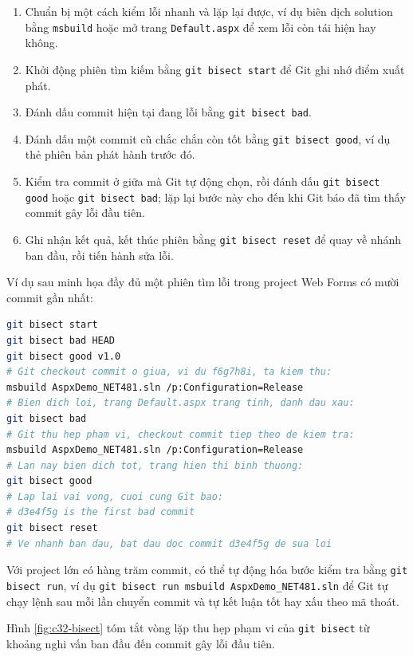 \begin{enumerate}
\item Chuẩn bị một cách kiểm lỗi nhanh và lặp lại được, ví dụ biên dịch solution bằng \verb|msbuild| hoặc mở trang \verb|Default.aspx| để xem lỗi còn tái hiện hay không.
\item Khởi động phiên tìm kiếm bằng \verb|git bisect start| để Git ghi nhớ điểm xuất phát.
\item Đánh dấu commit hiện tại đang lỗi bằng \verb|git bisect bad|.
\item Đánh dấu một commit cũ chắc chắn còn tốt bằng \verb|git bisect good|, ví dụ thẻ phiên bản phát hành trước đó.
\item Kiểm tra commit ở giữa mà Git tự động chọn, rồi đánh dấu \verb|git bisect good| hoặc \verb|git bisect bad|; lặp lại bước này cho đến khi Git báo đã tìm thấy commit gây lỗi đầu tiên.
\item Ghi nhận kết quả, kết thúc phiên bằng \verb|git bisect reset| để quay về nhánh ban đầu, rồi tiến hành sửa lỗi.
\end{enumerate}

Ví dụ sau minh họa đầy đủ một phiên tìm lỗi trong project Web Forms có mười commit gần nhất:

\begin{lstlisting}[language=bash, caption={Quy trinh git bisect tim commit gay loi dau tien}, label={lst:c32-bisect}]
git bisect start
git bisect bad HEAD
git bisect good v1.0
# Git checkout commit o giua, vi du f6g7h8i, ta kiem thu:
msbuild AspxDemo_NET481.sln /p:Configuration=Release
# Bien dich loi, trang Default.aspx trang tinh, danh dau xau:
git bisect bad
# Git thu hep pham vi, checkout commit tiep theo de kiem tra:
msbuild AspxDemo_NET481.sln /p:Configuration=Release
# Lan nay bien dich tot, trang hien thi binh thuong:
git bisect good
# Lap lai vai vong, cuoi cung Git bao:
# d3e4f5g is the first bad commit
git bisect reset
# Ve nhanh ban dau, bat dau doc commit d3e4f5g de sua loi
\end{lstlisting}

Với project lớn có hàng trăm commit, có thể tự động hóa bước kiểm tra bằng \verb|git bisect run|, ví dụ \verb|git bisect run msbuild AspxDemo_NET481.sln| để Git tự chạy lệnh sau mỗi lần chuyển commit và tự kết luận tốt hay xấu theo mã thoát.

Hình \ref{fig:c32-bisect} tóm tắt vòng lặp thu hẹp phạm vi của \verb|git bisect| từ khoảng nghi vấn ban đầu đến commit gây lỗi đầu tiên.

